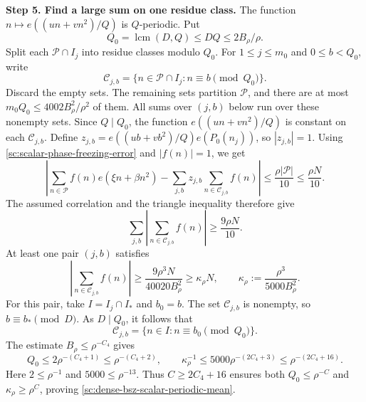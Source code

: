 \documentclass[twoside]{aomart}
\makeatletter
\theoremstyle{paperplain}
\theoremstyle{paperdefinition}
\renewenvironment{proof}[1][\proofname]{\par\pushQED{\qed}%
  \normalfont\topsep6\p@\@plus3\p@\relax\trivlist
  \item[\hskip\labelsep\itshape #1\@addpunct{.}]\ignorespaces
}{\popQED\endtrivlist\@endpefalse}
\numberwithin{equation}{section}
\makeatother
\begin{document}
\begin{proof}
\par
\medskip
\noindent\textbf{Step 5. Find a large sum on one residue class.}
The function $n\mapsto e((un+vn^2)/Q)$ is $Q$-periodic. Put
\begin{equation*}
 Q_0=\operatorname{lcm}(D,Q)\le DQ\le2B_\rho/\rho.
\end{equation*}
Split each $\mathcal P\cap I_j$ into residue classes modulo $Q_0$.
For $1\le j\le m_0$ and $0\le b<Q_0$, write
\begin{equation*}
 \mathcal C_{j,b}=\{n\in\mathcal P\cap I_j:n\equiv b\pmod{Q_0}\}.
\end{equation*}
Discard the empty sets. The remaining sets partition $\mathcal P$,
and there are at most $m_0Q_0\le4002B_\rho^2/\rho^2$ of them.
All sums over $(j,b)$ below run over these nonempty sets.
Since $Q\mid Q_0$, the function $e((un+vn^2)/Q)$ is constant
on each $\mathcal C_{j,b}$. Define
$z_{j,b}=e((ub+vb^2)/Q)e(P_0(n_j))$, so $|z_{j,b}|=1$.
Using \eqref{sc:scalar-phase-freezing-error} and $|f(n)|=1$, we get
\begin{equation*}
 \left|\sum_{n\in\mathcal P}f(n)e(\xi n+\beta n^2)
       -\sum_{j,b}z_{j,b}\sum_{n\in\mathcal C_{j,b}}f(n)\right|
 \le\frac{\rho|\mathcal P|}{10}\le\frac{\rho N}{10}.
\end{equation*}
The assumed correlation and the triangle inequality therefore give
\begin{equation*}
 \sum_{j,b}\left|\sum_{n\in\mathcal C_{j,b}}f(n)\right|
 \ge\frac{9\rho N}{10}.
\end{equation*}
At least one pair $(j,b)$ satisfies
\begin{equation}
 \left|\sum_{n\in\mathcal C_{j,b}}f(n)\right|
 \ge\frac{9\rho^3N}{40020B_\rho^2}
 \ge\kappa_\rho N,\qquad
 \kappa_\rho:=\frac{\rho^3}{5000B_\rho^2}.
 \label{sc:scalar-residue-sum}
\end{equation}
For this pair, take $I=I_j\cap I_*$ and $b_0=b$.
The set $\mathcal C_{j,b}$ is nonempty, so $b\equiv b_*\pmod D$.
As $D\mid Q_0$, it follows that
\[
 \mathcal C_{j,b}=\{n\in I:n\equiv b_0\pmod{Q_0}\}.
\]
The estimate $B_\rho\le\rho^{-C_4}$ gives
\begin{equation}
 Q_0\le2\rho^{-(C_4+1)}\le\rho^{-(C_4+2)},\qquad
 \kappa_\rho^{-1}\le5000\rho^{-(2C_4+3)}
       \le\rho^{-(2C_4+16)}.
 \label{sc:scalar-residue-power-bounds}
\end{equation}
Here $2\le\rho^{-1}$ and $5000\le\rho^{-13}$.
Thus $C\ge2C_4+16$ ensures both $Q_0\le\rho^{-C}$ and
$\kappa_\rho\ge\rho^C$, proving
\eqref{sc:dense-bsz-scalar-periodic-mean}.


\end{proof}
\end{document}

